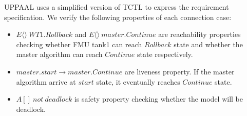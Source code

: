 UPPAAL uses a simplified version of TCTL \cite{BouchenebGR09} to express the requirement specification. We verify the following properties of each connection case:
\begin{itemize}
\item
$E\langle\rangle~WT1.Rollback$ and $E\langle\rangle~master.Continue$ are reachability properties checking whether FMU tank1 can reach $Rollback$ state and whether the master algorithm can reach $Continue$ state respectively.
\item
$master.start \rightarrow master.Continue$ are liveness property. If the master algorithm arrive at $start$ state, it eventually reaches $Continue$ state.
\item 
$A[]~not~deadlock$ is safety property checking whether the model will be deadlock.
\end{itemize}

